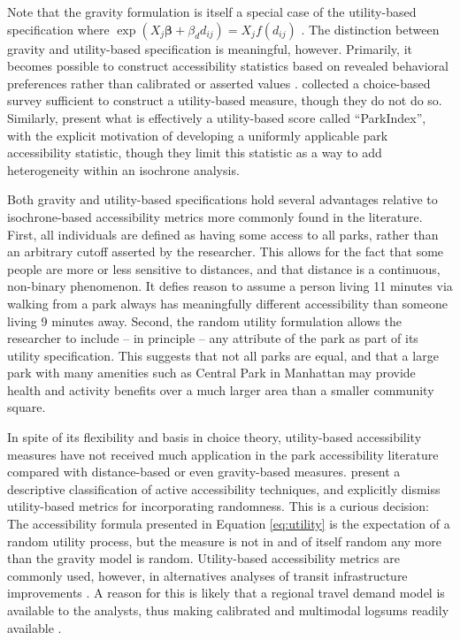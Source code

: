 \documentclass[shortAfour,sageh.bst]{sagej}
\begin{document}
Note that the gravity formulation is itself a special case of the
utility-based specification where
\(\exp(X_j\boldsymbol{\beta} + \beta_d d_{ij}) = X_j f(d_{ij})\)
\citep{Daly1982}. The distinction between gravity and utility-based
specification is meaningful, however. Primarily, it becomes possible to
construct accessibility statistics based on revealed behavioral
preferences rather than calibrated or asserted values \citep{Handy1997}.
\citet{Kinnell2006} collected a choice-based survey sufficient to
construct a utility-based measure, though they do not do so. Similarly,
\citet{Kaczynski2016} present what is effectively a utility-based score
called ``ParkIndex'', with the explicit motivation of developing a
uniformly applicable park accessibility statistic, though they limit
this statistic as a way to add heterogeneity within an isochrone
analysis.

Both gravity and utility-based specifications hold several advantages
relative to isochrone-based accessibility metrics more commonly found in
the literature. First, all individuals are defined as having some access
to all parks, rather than an arbitrary cutoff asserted by the
researcher. This allows for the fact that some people are more or less
sensitive to distances, and that distance is a continuous, non-binary
phenomenon. It defies reason to assume a person living 11 minutes via
walking from a park always has meaningfully different accessibility than
someone living 9 minutes away. Second, the random utility formulation
allows the researcher to include -- in principle -- any attribute of the
park as part of its utility specification. This suggests that not all
parks are equal, and that a large park with many amenities such as
Central Park in Manhattan may provide health and activity benefits over
a much larger area than a smaller community square.

In spite of its flexibility and basis in choice theory, utility-based
accessibility measures have not received much application in the park
accessibility literature compared with distance-based or even
gravity-based measures. \citet{Vale2016} present a descriptive
classification of active accessibility techniques, and explicitly
dismiss utility-based metrics for incorporating randomness. This is a
curious decision: The accessibility formula presented in Equation
\ref{eq:utility} is the expectation of a random utility process, but the
measure is not in and of itself random any more than the gravity model
is random. Utility-based accessibility metrics are commonly used,
however, in alternatives analyses of transit infrastructure improvements
\citep{DeJong2007}. A reason for this is likely that a regional travel
demand model is available to the analysts, thus making calibrated and
multimodal logsums readily available \citep{Geurs2010}.
\end{document}
